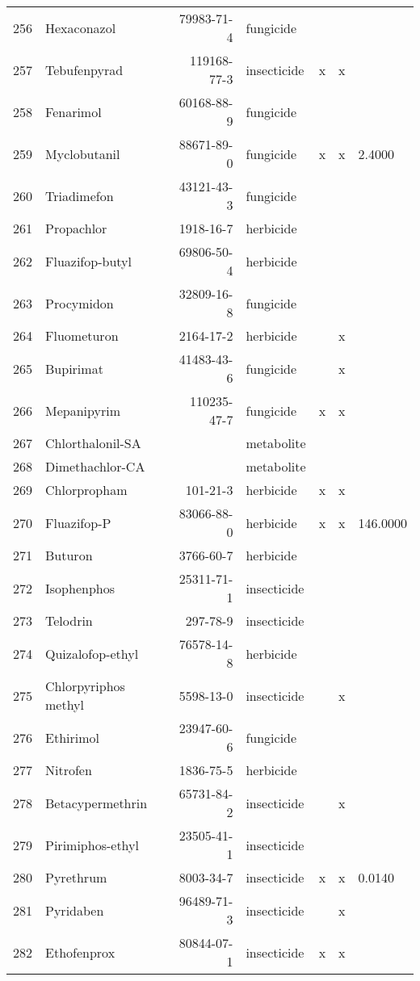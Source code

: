 \begin{longtable}{lp{3cm}rlp{0.5cm}p{0.5cm}p{1.5cm}}
  256 & Hexaconazol & 79983-71-4 & fungicide &  &  &  \\ 
  257 & Tebufenpyrad & 119168-77-3 & insecticide & x & x &  \\ 
  258 & Fenarimol & 60168-88-9 & fungicide &  &  &  \\ 
  259 & Myclobutanil & 88671-89-0 & fungicide & x & x & 2.4000 \\ 
  260 & Triadimefon & 43121-43-3 & fungicide &  &  &  \\ 
  261 & Propachlor & 1918-16-7 & herbicide &  &  &  \\ 
  262 & Fluazifop-butyl & 69806-50-4 & herbicide &  &  &  \\ 
  263 & Procymidon & 32809-16-8 & fungicide &  &  &  \\ 
  264 & Fluometuron & 2164-17-2 & herbicide &  & x &  \\ 
  265 & Bupirimat & 41483-43-6 & fungicide &  & x &  \\ 
  266 & Mepanipyrim & 110235-47-7 & fungicide & x & x &  \\ 
  267 & Chlorthalonil-SA &  & metabolite &  &  &  \\ 
  268 & Dimethachlor-CA &  & metabolite &  &  &  \\ 
  269 & Chlorpropham & 101-21-3 & herbicide & x & x &  \\ 
  270 & Fluazifop-P & 83066-88-0 & herbicide & x & x & 146.0000 \\ 
  271 & Buturon & 3766-60-7 & herbicide &  &  &  \\ 
  272 & Isophenphos & 25311-71-1 & insecticide &  &  &  \\ 
  273 & Telodrin & 297-78-9 & insecticide &  &  &  \\ 
  274 & Quizalofop-ethyl & 76578-14-8 & herbicide &  &  &  \\ 
  275 & Chlorpyriphos methyl & 5598-13-0 & insecticide &  & x &  \\ 
  276 & Ethirimol & 23947-60-6 & fungicide &  &  &  \\ 
  277 & Nitrofen & 1836-75-5 & herbicide &  &  &  \\ 
  278 & Betacypermethrin & 65731-84-2 & insecticide &  & x &  \\ 
  279 & Pirimiphos-ethyl & 23505-41-1 & insecticide &  &  &  \\ 
  280 & Pyrethrum & 8003-34-7 & insecticide & x & x & 0.0140 \\ 
  281 & Pyridaben & 96489-71-3 & insecticide &  & x &  \\ 
  282 & Ethofenprox & 80844-07-1 & insecticide & x & x &  \\ 

\end{longtable}
